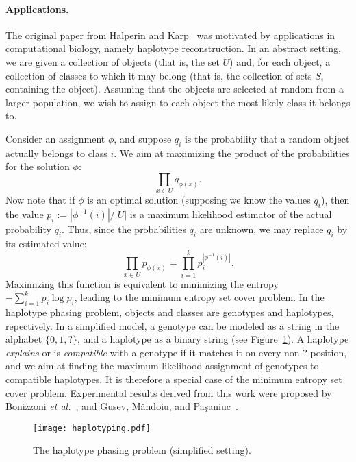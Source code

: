 \documentclass[10pt,a4paper]{article}
\begin{document}
\paragraph{Applications.}

The original paper from Halperin and Karp~\cite{HK05} was motivated by applications in computational biology, namely haplotype reconstruction. In an abstract setting, we are given a collection of objects (that is, the set $U$) and, for each object, a collection of classes to which it may belong (that is, the collection of sets $S_i$ containing the object). Assuming that the objects are selected at random from a larger population, we wish to assign to each object the most likely class it belongs to.

Consider an assignment $\phi$, and suppose $q_i$ is the probability that a random object actually belongs to class $i$. We aim at maximizing the product of the probabilities for the solution $\phi$:
$$
\prod_{x\in U} q_{\phi (x)} .
$$
Now note that if $\phi$ is an optimal solution (supposing we know the values $q_i$), then the value $p_i := |\phi^{-1}(i)| / |U|$ is a maximum likelihood estimator of the actual probability $q_i$.
Thus, since the probabilities $q_i$ are unknown, we may replace $q_i$ by its estimated value:
\begin{equation}
\prod_{x\in U} p_{\phi (x)} = \prod_{i=1}^k p_i^{ |\phi^{-1}(i)|}.
\end{equation}
Maximizing this function is equivalent to minimizing the entropy $- \sum_{i=1}^k p_i \log p_i$, leading to the minimum entropy set cover problem.
In the haplotype phasing problem, objects and classes are genotypes and haplotypes, repectively. In a simplified model, a genotype can be modeled as a string in the alphabet $\{ 0, 1, ?\}$, and a haplotype as a binary string (see Figure~\ref{fig:haplotyping}). A haplotype {\em explains} or is {\em compatible} with a genotype if it matches it on every non-? position, and we aim at finding the maximum likelihood assignment of genotypes to compatible haplotypes. It is therefore a special case of the minimum entropy set cover problem. Experimental results derived from this work were proposed by Bonizzoni {\em et al.}~\cite{BVDM05}, and Gusev, M\u{a}ndoiu, and Pa\c{s}aniuc~\cite{GMIP08}.

\begin{figure}
\begin{center}
\texttt{[image: haplotyping.pdf]}
\end{center}
\caption{\label{fig:haplotyping}The haplotype phasing problem (simplified setting).}
\end{figure}
\end{document}

